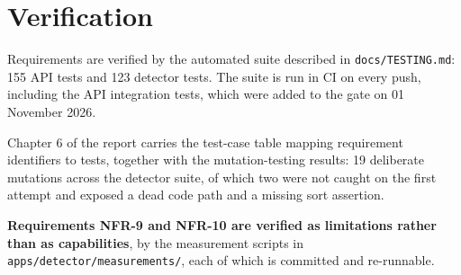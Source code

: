 \hypertarget{verification}{%
\section{Verification}\label{verification}}

Requirements are verified by the automated suite described in
\texttt{docs/TESTING.md}: 155 API tests and 123 detector tests. The
suite is run in CI on every push, including the API integration tests,
which were added to the gate on 01 November 2026.

Chapter 6 of the report carries the test-case table mapping requirement
identifiers to tests, together with the mutation-testing results: 19
deliberate mutations across the detector suite, of which two were not
caught on the first attempt and exposed a dead code path and a missing
sort assertion.

\textbf{Requirements NFR-9 and NFR-10 are verified as limitations rather
than as capabilities}, by the measurement scripts in
\texttt{apps/detector/measurements/}, each of which is committed and
re-runnable.
